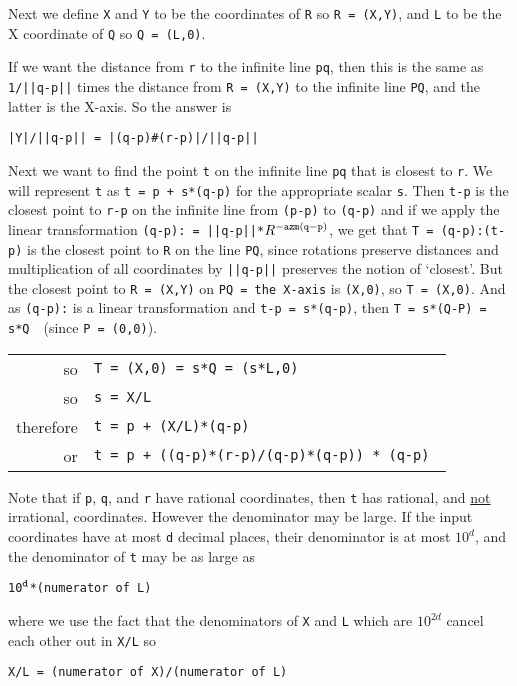 \documentclass[12pt]{article}
\begin{document}
Next we define {\tt X} and {\tt Y} to be the coordinates of {\tt R}
so {\tt R = (X,Y)}, and {\tt L} to be the X coordinate of {\tt Q}
so {\tt Q = (L,0)}.

If\label{DISTANCE-OF-LINE-TO-POINT}
we want the distance from {\tt r} to the infinite line {\tt pq},
then this is the same as {\tt 1/||q-p||} times
the distance from {\tt R = (X,Y)} to the infinite
line {\tt PQ}, and the latter is the X-axis.  So the answer is \\
\centerline{\tt |Y|/||q-p|| = |(q-p)\#(r-p)|/||q-p||}

Next we want to find the point {\tt t} on the infinite line {\tt pq}
that is closest to {\tt r}.  We will represent {\tt t} as {\tt t = p + s*(q-p)}
for the appropriate scalar {\tt s}.  Then {\tt t-p} is the closest point to
{\tt r-p} on the infinite line from {\tt (p-p)} to {\tt (q-p)}
and if we apply the
linear transformation {\tt (q-p):~= ||q-p||*$R^{\tt -azm (q-p)}$},
we get that {\tt T = (q-p):(t-p)} is the closest point to {\tt R} on the
line {\tt PQ}, since rotations preserve distances and multiplication
of all coordinates by {\tt ||q-p||} preserves the notion of `closest'.
But the closest point to {\tt R = (X,Y)} on {\tt PQ = {\rm the X-axis}}
is {\tt (X,0)}, so {\tt T = (X,0)}.
And as {\tt (q-p):} is a linear transformation and {\tt t-p = s*(q-p)},
then {\tt T = s*(Q-P) = s*Q}~~(since {\tt P = (0,0)}).

\hspace*{0.3in}\begin{tabular}{rl}
so	& \tt T = (X,0) = s*Q = (s*L,0) \\
so	& \tt s = X/L \\
therefore     & \tt t = p + (X/L)*(q-p) \\
or	& \tt t = p + ((q-p)*(r-p)/(q-p)*(q-p)) * (q-p) \\
\end{tabular}

Note that if {\tt p}, {\tt q}, and {\tt r} have rational coordinates,
then {\tt t} has rational\label{CLOSEST-IS-RATIONAL},
and \underline{not} irrational,
coordinates.  However the denominator may be large.  If
the input coordinates have at most {\tt d} decimal places,
their denominator is at most $10^d$, and the denominator of {\tt t}
may be as large as \\
\centerline{\tt 10$^{\tt d}$*({\rm numerator of} L)}
where we use the fact that the denominators of {\tt X} and {\tt L}
which are $10^{2d}$ cancel each other out in {\tt X/L} so \\
\centerline{\tt X/L = ({\rm numerator of} X)/({\rm numerator of} L)}
\end{document}
